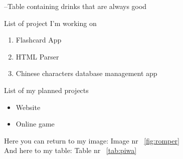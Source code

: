 \centering

--Table containing drinks that are always good
\par
\vspace{1cm}

List of project I'm working on
\begin{enumerate}
  \item Flashcard App
  \item HTML Parser
  \item Chinese characters database management app
\end{enumerate}
\vspace{1cm}

List of my planned projects
\begin{itemize}
\renewcommand{\labelitemi}{$*$}
    \item Website
    \item Online game
\end{itemize}
\vspace{1cm}

\raggedleft
Here you can return to my image: Image nr ~\ref{fig:romper} \\
And here to my table: Table nr ~\ref{tab:piwa}


